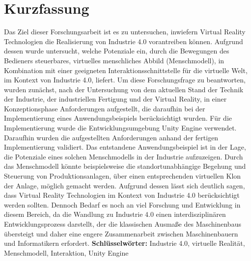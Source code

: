 \chapter*{Kurzfassung}\label{cha:Kurzfassung}

Das Ziel dieser Forschungsarbeit ist es zu untersuchen, inwiefern Virtual Reality Technologien die Realisierung von Industrie 4.0 vorantreiben können. Aufgrund dessen wurde untersucht, welche Potenziale ein, durch die Bewegungen des Bedieners steuerbares, virtuelles menschliches Abbild (Menschmodell), in Kombination mit einer geeigneten Interaktionsschnittstelle für die virtuelle Welt, im Kontext von Industrie 4.0, liefert.
Um diese Forschungsfrage zu beantworten, wurden zunächst, nach der Untersuchung von dem aktuellen Stand der Technik der Industrie, der industriellen Fertigung und der Virtual Reality, in einer Konzeptionsphase Anforderungen aufgestellt, die daraufhin bei der Implementierung eines Anwendungsbeispiels berücksichtigt wurden. Für die Implementierung wurde die Entwicklungsumgebung Unity Engine verwendet. Daraufhin wurden die aufgestellten Anforderungen anhand der fertigen Implementierung validiert.
Das entstandene Anwendungsbeispiel ist in der Lage, die Potenziale eines solchen Menschmodells in der Industrie aufzuzeigen. Durch das Menschmodell könnte beispielsweise die standortunabhängige Begehung und Steuerung von Produktionsanlagen, über einen entsprechenden virtuellen Klon der Anlage, möglich gemacht werden.
Aufgrund dessen lässt sich deutlich sagen, dass Virtual Reality Technologien im Kontext von Industrie 4.0 berücksichtigt werden sollten. Dennoch Bedarf es noch an viel Forschung und Entwicklung in diesem Bereich, da die Wandlung zu Industrie 4.0 einen interdisziplinären Entwicklungsprozess darstellt, der die klassischen Ausmaße des Maschinenbaus übersteigt und daher eine engere Zusammenarbeit zwischen Maschinenbauern und Informatikern erfordert.
\newline
\textbf{Schlüsselwörter:} Industrie 4.0, virtuelle Realität, Menschmodell, Interaktion, Unity Engine

\begingroup
\let\clearpage\relax
